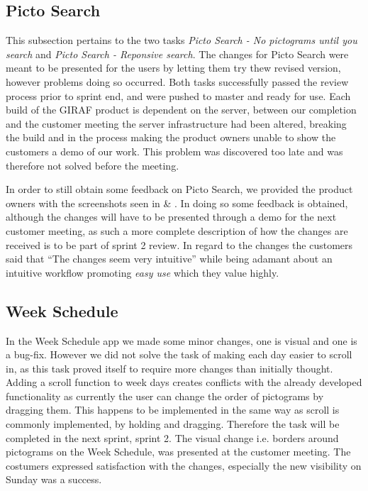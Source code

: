 \subsection{Picto Search}
This subsection pertains to the two tasks \textit{Picto Search - No pictograms until you search} and \textit{Picto Search - Reponsive search}.
The changes for Picto Search were meant to be presented for the users by letting them try thew revised version, however problems doing so occurred.
Both tasks successfully passed the review process prior to sprint end, and were pushed to master and ready for use.
Each build of the GIRAF product is dependent on the server, between our completion and the customer meeting the server infrastructure had been altered, breaking the build and in the process making the product owners unable to show the customers a demo of our work.
This problem was discovered too late and was therefore not solved before the meeting.

In order to still obtain some feedback on Picto Search, we provided the product owners with the screenshots seen in  \& .
In doing so some feedback is obtained, although the changes will have to be presented through a demo for the next customer meeting, as such a more complete description of how the changes are received is to be part of sprint 2 review.
In regard to the changes the customers said that \enquote{The changes seem very intuitive} while being adamant about an intuitive workflow promoting \textit{easy use} which they value highly.

\subsection{Week Schedule}
In the Week Schedule app we made some minor changes, one is visual and one is a bug-fix.
However we did not solve the task of making each day easier to scroll in, as this task proved itself to require more changes than initially thought.
Adding a scroll function to week days creates conflicts with the already developed functionality as currently the user can change the order of pictograms by dragging them.
This happens to be implemented in the same way as scroll is commonly implemented, by holding and dragging.
Therefore the task will be completed in the next sprint, sprint 2.
The visual change i.e. borders around pictograms on the Week Schedule, was presented at the customer meeting.
The costumers expressed satisfaction with the changes, especially the new visibility on Sunday was a success.

